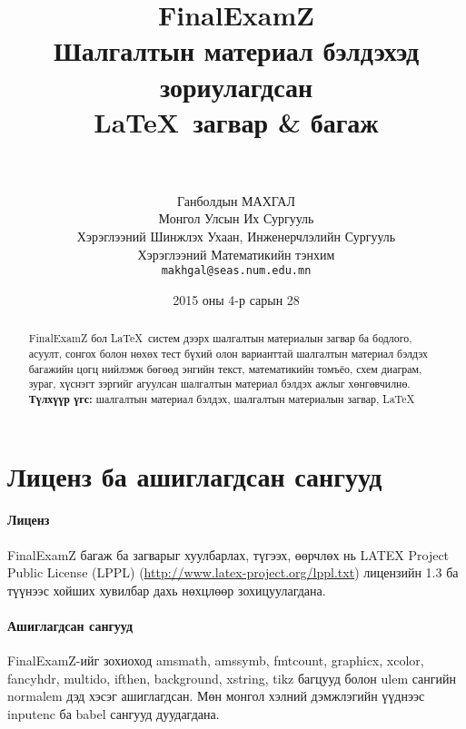 \documentclass[10pt]{article}
\theoremstyle{definition}
\begin{document}
\title{
  {\Huge FinalExamZ} \\[2mm] Шалгалтын материал бэлдэхэд зориулагдсан \\ \LaTeX\, загвар \& багаж \\[2mm] \large\version \\[2mm] \normalsize \svn}
\author{
  Ганболдын МАХГАЛ\\
  Монгол Улсын Их Сургууль\\
  Хэрэглээний Шинжлэх Ухаан, Инженерчлэлийн Сургууль\\
  Хэрэглээний Математикийн тэнхим\\[2mm]
  \texttt{makhgal@seas.num.edu.mn} \\[2mm]
  \www}
\newcommand{\version}{v1.0.0}
\newcommand{\www}{\url{http://www.galaa.mn/}}
\newcommand{\svn}{\url{https://github.com/galaamn/FinalExamZ}}
\date{2015 оны 4-р сарын 28}
\maketitle

\begin{abstract}
FinalExamZ бол \LaTeX\, систем дээрх шалгалтын материалын загвар ба бодлого, асуулт, сонгох болон нөхөх тест бүхий олон варианттай шалгалтын материал бэлдэх багажийн цогц нийлэмж бөгөөд энгийн текст, математикийн томъёо, схем диаграм, зураг, хүснэгт зэргийг агуулсан шалгалтын материал бэлдэх ажлыг хөнгөвчилнө.\\[2mm]
\textbf{Түлхүүр үгс:} шалгалтын материал бэлдэх, шалгалтын материалын загвар, \LaTeX
\end{abstract}

\tableofcontents

\section{Лиценз ба ашиглагдсан сангууд}\label{license}

\paragraph{Лиценз} FinalExamZ багаж ба загварыг хуулбарлах, түгээх, өөрчлөх нь LATEX Project Public License (LPPL) (\url{http://www.latex-project.org/lppl.txt}) лицензийн 1.3 ба түүнээс хойших хувилбар дахь нөхцлөөр зохицуулагдана.

\paragraph{Ашиглагдсан сангууд} FinalExamZ-ийг зохиоход amsmath, amssymb, fmtcount, graphicx, xcolor, fancyhdr, multido, ifthen, background, xstring, tikz багцууд болон ulem сангийн normalem дэд хэсэг ашиглагдсан. Мөн монгол хэлний дэмжлэгийн үүднээс inputenc ба babel сангууд дуудагдана.
\end{document}
